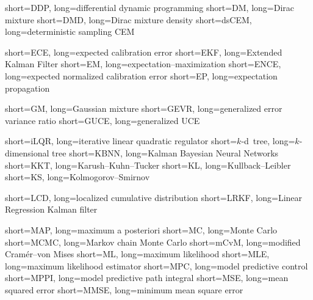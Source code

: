 		{short={DDP},	    	long={differential dynamic programming}}
	        {short={DM},	    	long={Dirac mixture}}
		{short={DMD},	    	long={Dirac mixture density}}
      {short={dsCEM},         long={deterministic sampling CEM}}

	    	{short={ECE},	    	long={expected calibration error}}
		{short={EKF},	    	long={Extended Kalman Filter}}
	    	{short={EM},	    	long={expectation--maximization}}
	    	{short={ENCE},	    	long={expected normalized calibration error}}
	    	{short={EP},	    	long={expectation propagation}}


	        {short={GM},	    	long={Gaussian mixture}}
	    {short={GEVR},	    	long={generalized error variance ratio}}
		{short={GUCE},	    	long={generalized \acs{UCE}}}


		{short={iLQR},	    	long={iterative linear quadratic regulator}}
		{short={\mbox{$k$-d~tree}},	    	long={$k$-dimensional tree}}
		{short={KBNN},	    	long={Kalman Bayesian Neural Networks}}
        {short={KKT},	    	long={Karush--Kuhn--Tucker}}
         {short={KL},            long={Kullback--Leibler}}
		    {short={KS},	    	long={Kolmogorov--Smirnov}}

		{short={LCD},	    	long={localized cumulative distribution}}
	    {short={LRKF},	    	long={Linear Regression Kalman filter}}

	    {short={MAP},	    	long={maximum a posteriori}}
	        {short={MC},	    	long={Monte Carlo}}
	    {short={MCMC},	    	long={Markov chain Monte Carlo}}
		{short={mCvM},	    	long={modified Cram\'er--von Mises}}
		    {short={ML},	    	long={maximum likelihood}}
		{short={MLE},	    	long={maximum likelihood estimator}}
		{short={MPC},	    	long={model predictive control}}
		{short={MPPI},	    	long={model predictive path integral}}
		{short={MSE},	    	long={mean squared error}}
		{short={MMSE},	    	long={minimum mean square error}}

